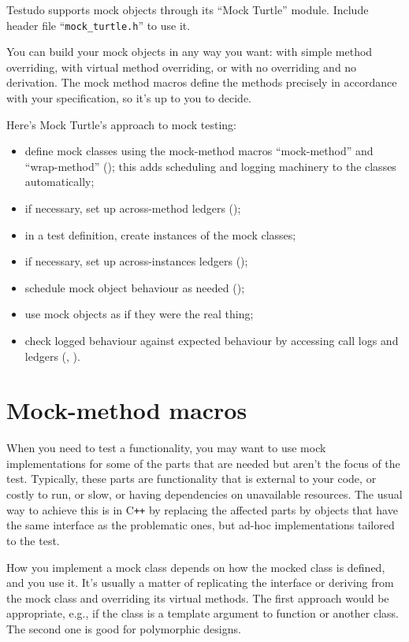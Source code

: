 \documentclass[twoside, a4paper, article]{memoir}
\newcommand*\Cpp{C\texttt{++}}
\begin{document}
Testudo supports mock objects through its ``Mock Turtle'' module.  Include
header file ``\texttt{mock\_turtle.h}'' to use it.

You can build your mock objects in any way you want: with simple method
overriding, with virtual method overriding, or with no overriding and no
derivation.  The mock method macros define the methods precisely in accordance
with your specification, so it's up to you to decide.

Here's Mock Turtle's approach to mock testing:
\begin{itemize}
\item define mock classes using the mock-method macros ``mock-method'' and
  ``wrap-method'' (); this adds scheduling and
  logging machinery to the classes automatically;
\item if necessary, set up across-method ledgers
  ();
\item in a test definition, create instances of the mock classes;
\item if necessary, set up across-instances ledgers
  ();
\item schedule mock object behaviour as needed
  ();
\item use mock objects as if they were the real thing;
\item check logged behaviour against expected behaviour by accessing call logs
  and ledgers (, ).
\end{itemize}

\section{Mock-method macros}
\label{sec:mock-method-macros}

When you need to test a functionality, you may want to use mock implementations
for some of the parts that are needed but aren't the focus of the test.
Typically, these parts are functionality that is external to your code, or
costly to run, or slow, or having dependencies on unavailable resources.  The
usual way to achieve this is in \Cpp{} by replacing the affected parts by
objects that have the same interface as the problematic ones, but ad-hoc
implementations tailored to the test.

How you implement a mock class depends on how the mocked class is defined, and
you use it.  It's usually a matter of replicating the interface or deriving
from the mock class and overriding its virtual methods.  The first approach
would be appropriate, e.g., if the class is a template argument to function or
another class.  The second one is good for polymorphic designs.
\end{document}
